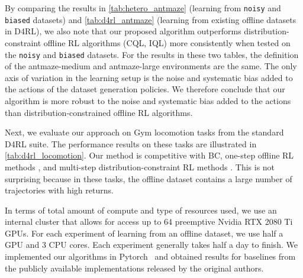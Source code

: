 By comparing the results in \autoref{tab:hetero_antmaze} (learning from \texttt{noisy} and \texttt{biased} datasets) and \autoref{tab:d4rl_antmaze} (learning from existing offline datasets in D4RL), we also note that our proposed algorithm outperforms distribution-constraint offline RL algorithms (CQL, IQL) more consistently when tested on the \texttt{noisy} and \texttt{biased} datasets. For the results in these two tables, the definition of the antmaze-medium and antmaze-large environments are the same. The only axis of variation in the learning setup is the noise and systematic bias added to the actions of the dataset generation policies. We therefore conclude that our algorithm is more robust to the noise and systematic bias added to the actions than distribution-constrained offline RL algorithms.


Next, we evaluate our approach on Gym locomotion tasks from the standard D4RL suite. The performance results on these tasks are illustrated in \autoref{tab:d4rl_locomotion}. Our method is competitive with BC, one-step offline RL methods \cite{brandfonbrener2021offline}, and multi-step distribution-constraint RL  methods \cite{kostrikov2021offline, kumar2020conservative}. This is not surprising because in these tasks, the offline dataset contains a large number of trajectories with high returns.

In terms of total amount of compute and type of resources used, we use an internal cluster that allows for access up to 64 preemptive Nvidia RTX 2080 Ti GPUs. For each experiment of learning from an offline dataset, we use half a GPU and 3 CPU cores. Each experiment generally takes half a day to finish. We implemented our algorithms in Pytorch~\cite{paszke2019pytorch} and obtained results for baselines from the publicly available implementations released by the original authors. 


